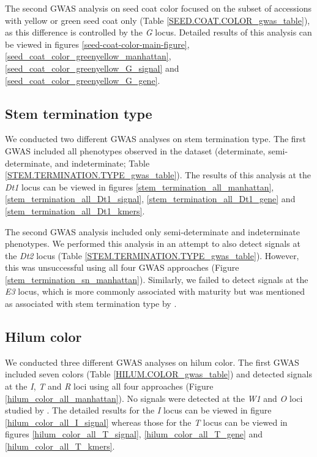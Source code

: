 The second GWAS analysis on seed coat color focused on the subset of accessions
with yellow or green seed coat only (Table \ref{SEED.COAT.COLOR_gwas_table}),
as this difference is controlled by the \emph{G} locus. Detailed results of
this analysis can be viewed in figures \ref{seed-coat-color-main-figure},
\ref{seed_coat_color_greenyellow_manhattan},
\ref{seed_coat_color_greenyellow_G_signal} and
\ref{seed_coat_color_greenyellow_G_gene}.

\subsection*{Stem termination type}
\label{sv-gwas-stem-termination}

We conducted two different GWAS analyses on stem termination type. The first GWAS
included all phenotypes observed in the dataset (determinate, semi-determinate,
and indeterminate; Table \ref{STEM.TERMINATION.TYPE_gwas_table}). The results
of this analysis at the \textit{Dt1} locus can be viewed in figures \ref{stem_termination_all_manhattan},
\ref{stem_termination_all_Dt1_signal}, \ref{stem_termination_all_Dt1_gene} and
\ref{stem_termination_all_Dt1_kmers}.

The second GWAS analysis included only
semi-determinate and indeterminate phenotypes. We performed this analysis in an attempt to also detect signals
at the \emph{Dt2} locus (Table \ref{STEM.TERMINATION.TYPE_gwas_table}).
However, this was unsuccessful using all four GWAS
approaches (Figure \ref{stem_termination_sn_manhattan}). Similarly, we failed to
detect signals at the \textit{E3} locus, which is more commonly associated
with maturity but was mentioned as associated with stem termination type by
\cite{bandillo2017}.

\subsection*{Hilum color}
\label{sv-gwas-hilum-color}

We conducted three different GWAS analyses on hilum color. The first GWAS
included seven colors (Table \ref{HILUM.COLOR_gwas_table}) and detected signals
at the \emph{I}, \emph{T} and \emph{R} loci using all four approaches
(Figure \ref{hilum_color_all_manhattan}). No signals
were detected at the \emph{W1} and \emph{O} loci studied by
\cite{bandillo2017}. The detailed results for the \textit{I} locus can be viewed
in figure \ref{hilum_color_all_I_signal} whereas those for the \textit{T} locus
can be viewed in figures \ref{hilum_color_all_T_signal}, \ref{hilum_color_all_T_gene}
and \ref{hilum_color_all_T_kmers}.

